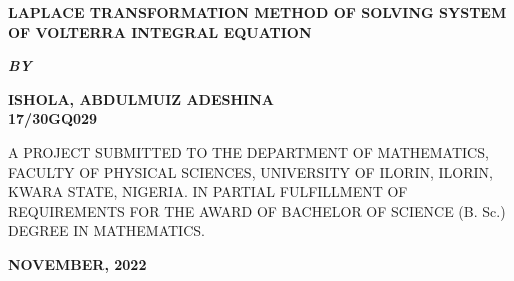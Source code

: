 \documentclass[11pt]{report}
\newcommand{\bt}[1]{\textbf{#1}}
\begin{document}
	
	\clearpage
	\thispagestyle{empty}
	\begin{center}
		\Large \bt{LAPLACE TRANSFORMATION METHOD OF SOLVING SYSTEM OF VOLTERRA INTEGRAL EQUATION}
	\end{center}

	\hspace{7cm}
	
	\begin{center}
		\textbf{\textit{BY}}
	\end{center}
	
	\hspace{5cm}
	
	\begin{center}
		\large \textbf{ISHOLA, ABDULMUIZ ADESHINA
			\\
			17/30GQ029}
	\end{center}
	
	\hspace{9cm}
	
	\begin{center}
		A PROJECT SUBMITTED TO THE DEPARTMENT OF MATHEMATICS, FACULTY OF PHYSICAL SCIENCES, UNIVERSITY OF ILORIN, ILORIN, KWARA STATE, NIGERIA. IN PARTIAL FULFILLMENT OF REQUIREMENTS FOR THE AWARD OF BACHELOR OF SCIENCE (B. Sc.) DEGREE IN MATHEMATICS.
	\end{center}

	\hspace{7cm}
	
	\begin{center}
		\textbf{NOVEMBER, 2022}
	\end{center}

	\newpage
\end{document}
